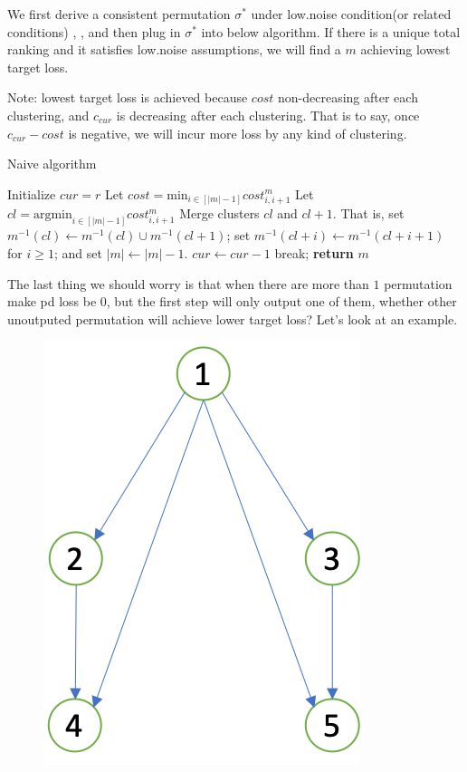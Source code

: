 	We first derive a consistent permutation $\sigma^*$ under low.noise condition(or related conditions) \cite{Ramaswamy2013}, \cite{duchi2010}, and then plug in $\sigma^*$ into below algorithm. If there is a unique total ranking and it satisfies low.noise assumptions, we will find a $m$ achieving lowest target loss.
	
	Note: lowest target loss is achieved  because $cost$ non-decreasing after each clustering, and $c_{cur}$ is decreasing after each clustering. That is to say, once $c_{cur}-cost$ is negative, we will incur more loss by any kind of clustering.

\begin{algorithm}[H]
	\caption{Naive algorithm}
	\begin{algorithmic}[1]
		\State Initialize $cur=r$
		\State
		Let $cost=\text{min}_{i\in [|m|-1]} cost^m_{i, i+1}$
		\State 
		Let $cl = \text{argmin}_{i\in [|m|-1]} cost^m_{i, i+1}$
		\State Merge clusters $cl$ and $cl+1$. That is, 
		set $m^{-1}(cl)\leftarrow m^{-1}(cl)\cup m^{-1}(cl+1)$; set $m^{-1}(cl+i)\leftarrow m^{-1}(cl+i+1)$ for $i\geq 1$; and set $|m|\leftarrow |m|-1$.
		\State $cur\leftarrow cur-1$
		\Else\quad
			break; 
		\EndIf		
		\EndFor
		\State \textbf{return} $m$
		\EndProcedure
	\end{algorithmic}
\end{algorithm}
The last thing we should worry is that when there are more than $1$ permutation make pd loss be $0$, but the first step will only output one of them, whether other unoutputed permutation will achieve lower target loss?  Let's look at an example.
\begin{figure}[h]
	\begin{center}
\includegraphics[scale=0.5]{figure/eg1.png}
	\end{center}
\end{figure}
